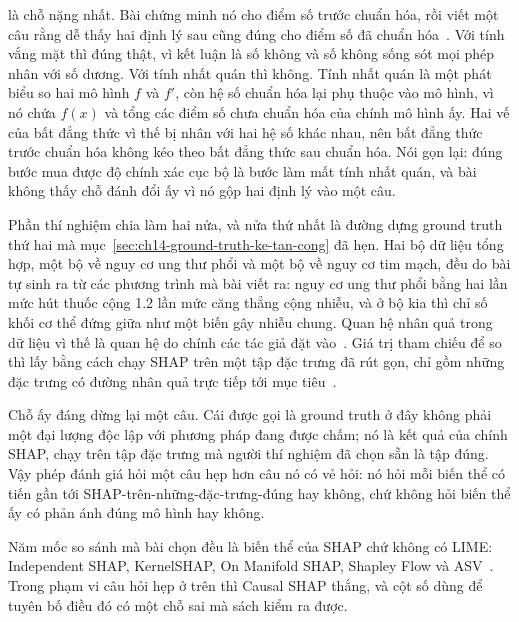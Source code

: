 %
 là chỗ nặng nhất. Bài chứng minh nó cho điểm số trước chuẩn hóa,
rồi viết một câu rằng dễ thấy hai định lý sau cũng đúng cho điểm số đã chuẩn
hóa~\autocite{p29causalshap}. Với tính vắng mặt thì đúng thật, vì kết luận là
số không và số không sống sót mọi phép nhân với số dương. Với tính nhất quán
thì không. Tính nhất quán là một phát biểu so hai mô hình $f$ và $f'$, còn hệ
số chuẩn hóa lại phụ thuộc vào mô hình, vì nó chứa $f(x)$ và tổng các điểm số
chưa chuẩn hóa của chính mô hình ấy. Hai vế của bất đẳng thức vì thế bị nhân
với hai hệ số khác nhau, nên bất đẳng thức trước chuẩn hóa không kéo theo bất
đẳng thức sau chuẩn hóa. Nói gọn lại: đúng bước mua được độ chính xác cục bộ là
bước làm mất tính nhất quán, và bài không thấy chỗ đánh đổi ấy vì nó gộp hai
định lý vào một câu.

%
Phần thí nghiệm chia làm hai nửa, và nửa thứ nhất là đường dựng ground truth
thứ hai mà mục~\ref{sec:ch14-ground-truth-ke-tan-cong} đã hẹn. Hai bộ dữ liệu
tổng hợp, một bộ về nguy cơ ung thư phổi và một bộ về nguy cơ tim mạch, đều do
bài tự sinh ra từ các phương trình mà bài viết ra: nguy cơ ung thư phổi bằng
hai lần mức hút thuốc cộng 1.2 lần mức căng thẳng cộng nhiễu, và ở bộ kia thì
chỉ số khối cơ thể đứng giữa như một biến gây nhiễu chung. Quan hệ nhân quả
trong dữ liệu vì thế là quan hệ do chính các tác giả đặt
vào~\autocite{p29causalshap}. Giá trị tham chiếu để so thì lấy bằng cách chạy
SHAP trên một tập đặc trưng đã rút gọn, chỉ gồm những đặc trưng có đường nhân
quả trực tiếp tới mục tiêu~\autocite{p29causalshap}.

Chỗ ấy đáng dừng lại một câu. Cái được gọi là ground truth ở đây không phải một
đại lượng độc lập với phương pháp đang được chấm; nó là kết quả của chính SHAP,
chạy trên tập đặc trưng mà người thí nghiệm đã chọn sẵn là tập đúng. Vậy phép
đánh giá hỏi một câu hẹp hơn câu nó có vẻ hỏi: nó hỏi mỗi biến thể có tiến gần
tới SHAP-trên-những-đặc-trưng-đúng hay không, chứ không hỏi biến thể ấy có phản
ánh đúng mô hình hay không.

%
Năm mốc so sánh mà bài chọn đều là biến thể của SHAP chứ không có LIME:
Independent SHAP, KernelSHAP, On Manifold SHAP, Shapley Flow và
ASV~\autocite{p29causalshap}. Trong phạm vi câu hỏi hẹp ở trên thì Causal SHAP
thắng, và cột số dùng để tuyên bố điều đó có một chỗ sai mà sách kiểm ra được.

